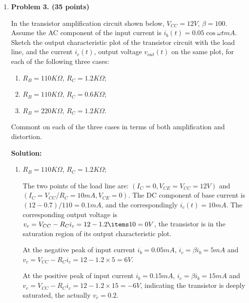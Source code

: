\begin{enumerate}
\begin{itemize}
\item Then answer the same questions above assuming $V_{CC}=6 V$. 
\end{itemize}


{\bf Solution:} $I_B=(1-0.7)V /15 K\Omega=20 \mu A$, $I_C=2 mA$, 
When $V_{CC}=12 V$, $V_C=V_{CC}-R_C I_C=12V-3 K\Omega\; 2 mA=6 V$. 
$2(6-0.3)=2\times 5.7=11.4V$.

When $V_{CC}=6 V$, $V_C=V_{CC}-R_C I_C=6V-1.5 K\Omega 2 mA=3 V$. 
$2(3-0.3)=2\times 2.7=5.4V$.

\item {\bf Problem 3. (35 points)}

In the transistor amplification circuit shown below, $V_{CC}=12V$, 
$\beta=100$. Assume the AC component of the input current is 
$i_b(t)=0.05\cos \omega t mA$. Sketch the output characteristic plot 
of the transistor circuit with the load line, and the current $i_c(t)$,
output voltage $v_{out}(t)$ on the same plot, for each of the following 
three cases:
\begin{enumerate}
\item $R_B=110 K\Omega$, $R_C=1.2 K\Omega$;
\item $R_B=110 K\Omega$, $R_C=0.6 K\Omega$;
\item $R_B=220 K\Omega$, $R_C=1.2 K\Omega$.
\end{enumerate}
Commont on each of the three cases in terms of both amplification and 
distortion.


{\bf Solution:}

\begin{enumerate}
\item $R_B=110 K\Omega$, $R_C=1.2 K\Omega$; 

The two points of the load line are:
$(I_C=0, V_{CE}=V_{CC}=12V)$ and $(I_C=V_{CC}/R_C=10 mA, V_{CE}=0)$.
The DC component of base current is $(12-0.7)/110=0.1 mA$, and the
correspondingly $i_c(t)=10 mA$. The corresponding output voltage is 
$v_c=V_{CC}-R_C i_c=12 - 1.2\items 10=0 V$, the transistor is in the
saturation region of its output characteristic plot. 

At the negative peak of input current $i_b=0.05 mA$, 
$i_c=\beta i_b=5 mA$ and $v_c=V_{CC}-R_C i_c=12-1.2\times 5=6V$. 

At the positive peak of input current $i_b=0.15 mA$, 
$i_c=\beta i_b=15 mA$ and $v_c=V_{CC}-R_C i_c=12-1.2\times 15=-6V$, 
indicating the transistor is deeply saturated, the actually $v_c=0.2$.


\end{enumerate}
\end{enumerate}
